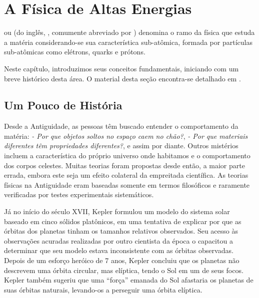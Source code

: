 \typeout{ ====================================================================}
\typeout{ ====================================================================}

\chapter{A Física de Altas Energias}
\label{chap:introducao}

 ou  (do inglês,
, comumente abreviado por ) denomina o
ramo da física que estuda a matéria considerando-se sua característica
sub-atômica, formada por partículas sub-atômicas como elétrons, quarks e
prótons.

Neste capítulo, introduzimos seus conceitos fundamentais, iniciando com um
breve histórico desta área. O material desta seção encontra-se detalhado em
\cite{partadv}.


\section{Um Pouco de História}

Desde a Antiguidade, as pessoas têm buscado entender o comportamento da
matéria: \textit{- Por que objetos soltos no espaço caem no chão?}, \textit{-
Por que materiais diferentes têm propriedades diferentes?}, e assim por
diante. Outros mistérios incluem a característica do próprio universo onde
habitamos e o comportamento dos corpos celestes. Muitas teorias foram
propostas desde então, a maior parte errada, embora este seja um efeito
colateral da empreitada científica. As teorias físicas na Antiguidade eram
baseadas somente em termos filosóficos e raramente verificadas por testes
experimentais sistemáticos.

Já no início do século XVII, Kepler formulou um modelo do sistema solar
baseado em cinco sólidos platônicos, em uma tentativa de explicar por que as
órbitas dos planetas tinham os tamanhos relativos observados. Seu acesso às
observações acuradas realizadas por outro cientista da época o capacitou
a determinar que seu modelo estava inconsistente com as órbitas
observadas. Depois de um esforço heróico de 7 anos, Kepler concluiu que os
planetas não descrevem uma órbita circular, mas elíptica, tendo o Sol em um de
seus focos. Kepler também sugeriu que uma ``força'' emanada do Sol afastaria
os planetas de suas órbitas naturais, levando-os a perseguir uma órbita
elíptica.

